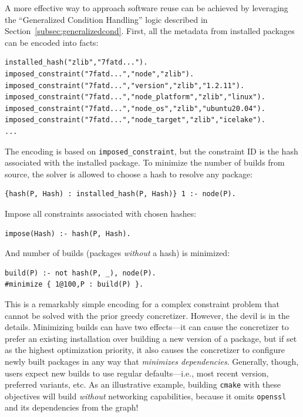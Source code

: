 
A more effective way to approach software reuse can be achieved by leveraging the
``Generalized Condition Handling'' logic described in
Section~\ref{subsec:generalizedcond}. First, all the metadata from installed packages
can be encoded into facts:
\begin{verbatim}
installed_hash("zlib","7fatd...").
imposed_constraint("7fatd...","node","zlib").
imposed_constraint("7fatd...","version","zlib","1.2.11").
imposed_constraint("7fatd...","node_platform","zlib","linux").
imposed_constraint("7fatd...","node_os","zlib","ubuntu20.04").
imposed_constraint("7fatd...","node_target","zlib","icelake").
...
\end{verbatim}
The encoding is based on \texttt{imposed\_constraint}, but the constraint ID is the
hash associated with the installed package. To minimize the number of builds from
source, the solver is allowed to choose a hash to resolve any package:
\begin{verbatim}
{hash(P, Hash) : installed_hash(P, Hash)} 1 :- node(P).
\end{verbatim}
Impose all constraints associated with chosen hashes:
\begin{verbatim}
impose(Hash) :- hash(P, Hash).
\end{verbatim}
And number of builds (packages \emph{without} a hash) is minimized:
\begin{verbatim}
build(P) :- not hash(P, _), node(P).
#minimize { 1@100,P : build(P) }.
\end{verbatim}

This is a remarkably simple encoding for a complex constraint problem that cannot be
solved with the prior greedy concretizer. However, the devil is in the details.
Minimizing builds can have two effects---it can cause the concretizer to prefer an
existing installation over building a new version of a package, but if set as the
highest optimization priority, it also causes the concretizer to configure newly built
packages in any way that {\it minimizes dependencies}. Generally, though, users expect
new builds to use regular defaults---i.e., most recent version, preferred variants, etc.
As an illustrative example, building \texttt{cmake} with these objectives will build
{\it without} networking capabilities, because it omits \texttt{openssl} and its
dependencies from the graph!

